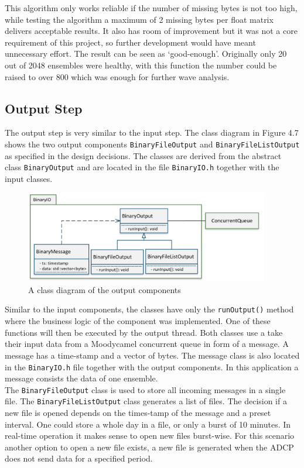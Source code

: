 This algorithm only works reliable if the number of missing bytes is not too high, while testing the algorithm a maximum of 2 missing bytes per float matrix delivers acceptable results. It also has room of improvement but it was not a core requirement of this project, so further development would have meant unnecessary effort. The result can be seen as `good-enough'. Originally only 20 out of 2048 ensembles were healthy, with this function the number could be raised to over 800 which was enough for further wave analysis.

\subsection{Output Step}
The output step is very similar to the input step. The class diagram in Figure 4.7 shows the two output components \texttt{BinaryFileOutput} and \texttt{BinaryFileListOutput} as specified in the design decisions. The classes are derived from the abstract class \texttt{BinaryOutput} and are located in the file \texttt{BinaryIO.h} together with the input classes.

\begin{figure}[h]
\centering
      \includegraphics[width=0.95\textwidth]{output}
        \caption{A class diagram of the output components}
\end{figure}

Similar to the input components, the classes have only the \texttt{runOutput()} method where the business logic of the component was implemented. One of these functions will then be executed by the output thread. Both classes use a take their input data from a Moodycamel concurrent queue in form of a message. A message has a time-stamp and a vector of bytes. The message class is also located in the \texttt{BinaryIO.h} file together with the output components. In this application a message consists the data of one ensemble.\\ 
The \texttt{BinaryFileOutput} class is used to store all incoming messages in a single file. The \texttt{BinaryFileListOutput} class generates a list of files. The decision if a new file is opened depends on the times-tamp of the message and a preset interval. One could store a whole day in a file, or only a burst of 10 minutes. In real-time operation it makes sense to open new files burst-wise. For this scenario  another option to open a new file exists, a new file is generated when  the ADCP does not send data for a specified period.
